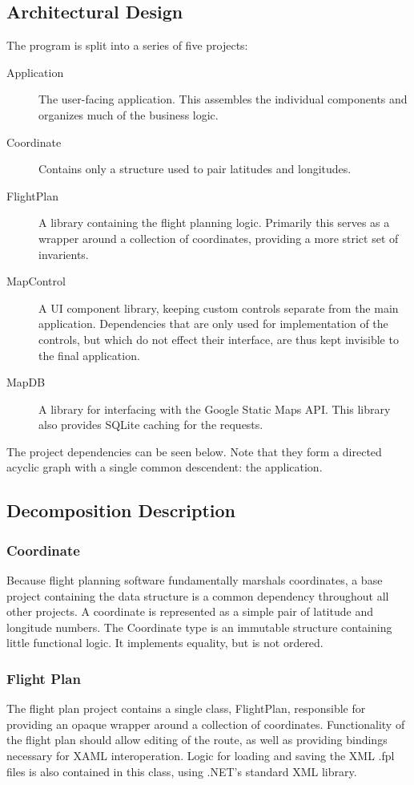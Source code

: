 \documentclass[12pt, letterpaper]{article}
\begin{document}
\subsection{Architectural Design}
The program is split into a series of five projects:
\begin{description}
  \item[Application] The user-facing application.
    This assembles the individual components and organizes much of the business logic.
  \item[Coordinate] Contains only a structure used to pair latitudes and longitudes.
  \item[FlightPlan] A library containing the flight planning logic.
    Primarily this serves as a wrapper around a collection of coordinates, providing a more strict set of invarients.
  \item[MapControl] A UI component library, keeping custom controls separate from the main application.
    Dependencies that are only used for implementation of the controls, but which do not effect their interface, are thus kept invisible to the final application.
  \item[MapDB] A library for interfacing with the Google Static Maps API.
    This library also provides SQLite caching for the requests.
\end{description}
The project dependencies can be seen below.
Note that they form a directed acyclic graph with a single common descendent: the application.

\subsection{Decomposition Description}
\subsubsection{Coordinate}
Because flight planning software fundamentally marshals coordinates,
a base project containing the data structure is a common dependency throughout all other projects.
A coordinate is represented as a simple pair of latitude and longitude numbers.
The Coordinate type is an immutable structure containing little functional logic.
It implements equality, but is not ordered.

\subsubsection{Flight Plan}
The flight plan project contains a single class, FlightPlan, responsible for providing an opaque wrapper around a collection of coordinates.
Functionality of the flight plan should allow editing of the route, as well as providing bindings necessary for XAML interoperation.
Logic for loading and saving the XML .fpl files is also contained in this class, using .NET's standard XML library.
\end{document}

